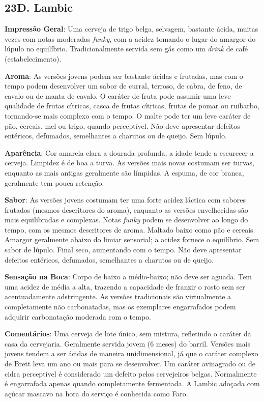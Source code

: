 \subsection*{23D. Lambic}
\textbf{Impressão Geral}: Uma cerveja de trigo belga, selvagem, bastante ácida, muitas vezes com notas moderadas \textit{funky}, com a acidez tomando o lugar do amargor do lúpulo no equilíbrio. Tradicionalmente servida sem gás como um \textit{drink} de café (estabelecimento).

\textbf{Aroma}: As versões jovens podem ser bastante ácidas e frutadas, mas com o tempo podem desenvolver um sabor de curral, terroso, de cabra, de feno, de cavalo ou de manta de cavalo. O caráter de fruta pode assumir uma leve qualidade de frutas cítricas, casca de frutas cítricas, frutas de pomar ou ruibarbo, tornando-se mais complexo com o tempo. O malte pode ter um leve caráter de pão, cereais, mel ou trigo, quando perceptível. Não deve apresentar defeitos entéricos, defumados, semelhantes a charutos ou de queijo. Sem lúpulo.

\textbf{Aparência}: Cor amarela clara a dourada profunda, a idade tende a escurecer a cerveja. Limpidez é de boa a turva. As versões mais novas costumam ser turvas, enquanto as mais antigas geralmente são límpidas. A espuma, de cor branca, geralmente tem pouca retenção.

\textbf{Sabor}: As versões jovens costumam ter uma forte acidez láctica com sabores frutados (mesmos descritores do aroma), enquanto as versões envelhecidas são mais equilibradas e complexas. Notas \textit{funky} podem se desenvolver ao longo do tempo, com os mesmos descritores de aroma. Maltado baixo como pão e cereais. Amargor geralmente abaixo do limiar sensorial; a acidez fornece o equilíbrio. Sem sabor de lúpulo. Final seco, aumentando com o tempo. Não deve apresentar defeitos entéricos, defumados, semelhantes a charutos ou de queijo.

\textbf{Sensação na Boca}: Corpo de baixo a médio-baixo; não deve ser aguada. Tem uma acidez de média a alta, trazendo a capacidade de franzir o rosto sem ser acentuadamente adstringente. As versões tradicionais são virtualmente a completamente não carbonatadas, mas os exemplares engarrafados podem adquirir carbonatação moderada com o tempo.

\textbf{Comentários}: Uma cerveja de lote único, sem mistura, refletindo o caráter da casa da cervejaria. Geralmente servida jovem (6 meses) do barril. Versões mais jovens tendem a ser ácidas de maneira unidimensional, já que o caráter complexo de Brett leva um ano ou mais para se desenvolver. Um caráter avinagrado ou de cidra perceptível é considerado um defeito pelos cervejeiros belgas. Normalmente é engarrafada apenas quando completamente fermentada. A Lambic adoçada com açúcar mascavo na hora do serviço é conhecida como Faro.

